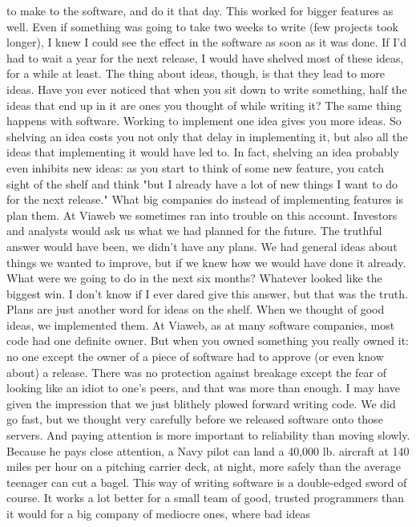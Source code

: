 to make to the software, and do it that day.  This worked for bigger
features as well.  Even if something was going to take two weeks
to write (few projects took longer), I knew I could see the effect
in the software as soon as it was done.
If I'd had to wait a year for the next release, I would have shelved
most of these ideas, for a while at least.  The thing about ideas,
though, is that they lead to more ideas.  Have you ever noticed
that when you sit down to write something, half the ideas that end
up in it are ones you thought of while writing it?  The same thing
happens with software.  Working to implement one idea gives you
more ideas.  So shelving an idea costs you not only that delay in
implementing it, but also all the ideas that implementing it would
have led to.  In fact, shelving an idea probably even inhibits new
ideas: as you start to think of some new feature, you catch sight
of the shelf and think "but I already have a lot of new things I
want to do for the next release."
What big companies do instead of implementing features is plan
them.  At Viaweb we sometimes ran into trouble on this account.
Investors and analysts would ask us what we had planned for the
future.  The truthful answer would have been, we didn't have any
plans.  We had general ideas about things we wanted to improve,
but if we knew how we would have done it already.  What were we
going to do in the next six months? Whatever looked like the biggest
win.  I don't know if I ever dared give this answer, but that was
the truth.  Plans are just another word for ideas on the shelf.
When we thought of good ideas, we implemented them.
At Viaweb, as at many software companies, most code had one definite
owner.  But when you owned something you really owned it: no one
except the owner of a piece of software had to approve (or even
know about) a release.  There was no protection against breakage
except the fear of looking like an idiot to one's peers, and that
was more than enough.  I may have given the impression that we just
blithely plowed forward writing code.  We did go fast, but we
thought very carefully before we released software onto those
servers.  And paying attention is more important to reliability
than moving slowly.  Because he pays close attention, a Navy pilot
can land a 40,000 lb. aircraft at 140 miles per hour on a pitching
carrier deck, at night, more safely than the average teenager can
cut a bagel.
This way of writing software is a double-edged sword of course.
It works a lot better for a small team of good, trusted programmers
than it would for a big company of mediocre ones, where bad ideas
